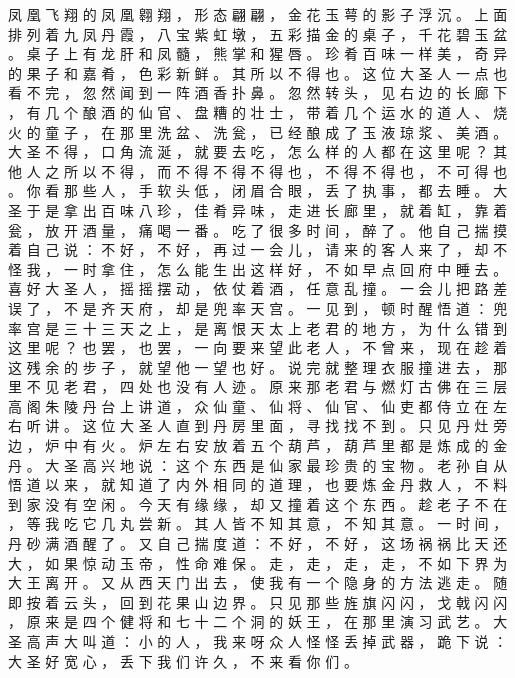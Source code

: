 {凤 凰 飞 翔 的 凤 凰 翱 翔 ， 形 态 翩 翩 ， 金 花 玉 萼 的 影 子 浮 沉 。
上 面 排 列 着 九 凤 丹 霞 ， 八 宝 紫 虹 墩 ， 五 彩 描 金 的 桌 子 ， 千 花 碧 玉 盆 。
桌 子 上 有 龙 肝 和 凤 髓 ， 熊 掌 和 猩 唇 。
珍 肴 百 味 一 样 美 ， 奇 异 的 果 子 和 嘉 肴 ， 色 彩 新 鲜 。
其 所 以 不 得 也 。
这 位 大 圣 人 一 点 也 看 不 完 ， 忽 然 闻 到 一 阵 酒 香 扑 鼻 。
忽 然 转 头 ， 见 右 边 的 长 廊 下 ， 有 几 个 酿 酒 的 仙 官 、 盘 糟 的 壮 士 ， 带 着 几 个 运 水 的 道 人 、 烧 火 的 童 子 ， 在 那 里 洗 盆 、 洗 瓮 ， 已 经 酿 成 了 玉 液 琼 浆 、 美 酒 。
大 圣 不 得 ， 口 角 流 涎 ， 就 要 去 吃 ， 怎 么 样 的 人 都 在 这 里 呢 ？
其 他 人 之 所 以 不 得 ， 而 不 得 不 得 不 得 也 ， 不 得 不 得 也 ， 不 可 得 也 。
你 看 那 些 人 ， 手 软 头 低 ， 闭 眉 合 眼 ， 丢 了 执 事 ， 都 去 睡 。
大 圣 于 是 拿 出 百 味 八 珍 ， 佳 肴 异 味 ， 走 进 长 廊 里 ， 就 着 缸 ， 靠 着 瓮 ， 放 开 酒 量 ， 痛 喝 一 番 。
吃 了 很 多 时 间 ， 醉 了 。
他 自 己 揣 摸 着 自 己 说 ： 不 好 ， 不 好 ， 再 过 一 会 儿 ， 请 来 的 客 人 来 了 ， 却 不 怪 我 ， 一 时 拿 住 ， 怎 么 能 生 出 这 样 好 ， 不 如 早 点 回 府 中 睡 去 。
喜 好 大 圣 人 ， 摇 摇 摆 动 ， 依 仗 着 酒 ， 任 意 乱 撞 。
一 会 儿 把 路 差 误 了 ， 不 是 齐 天 府 ， 却 是 兜 率 天 宫 。
一 见 到 ， 顿 时 醒 悟 道 ： 兜 率 宫 是 三 十 三 天 之 上 ， 是 离 恨 天 太 上 老 君 的 地 方 ， 为 什 么 错 到 这 里 呢 ？ 也 罢 ， 也 罢 ， 一 向 要 来 望 此 老 人 ， 不 曾 来 ， 现 在 趁 着 这 残 余 的 步 子 ， 就 望 他 一 望 也 好 。
说 完 就 整 理 衣 服 撞 进 去 ， 那 里 不 见 老 君 ， 四 处 也 没 有 人 迹 。
原 来 那 老 君 与 燃 灯 古 佛 在 三 层 高 阁 朱 陵 丹 台 上 讲 道 ， 众 仙 童 、 仙 将 、 仙 官 、 仙 吏 都 侍 立 在 左 右 听 讲 。
这 位 大 圣 人 直 到 丹 房 里 面 ， 寻 找 找 不 到 。
只 见 丹 灶 旁 边 ， 炉 中 有 火 。
炉 左 右 安 放 着 五 个 葫 芦 ， 葫 芦 里 都 是 炼 成 的 金 丹 。
大 圣 高 兴 地 说 ： 这 个 东 西 是 仙 家 最 珍 贵 的 宝 物 。
老 孙 自 从 悟 道 以 来 ， 就 知 道 了 内 外 相 同 的 道 理 ， 也 要 炼 金 丹 救 人 ， 不 料 到 家 没 有 空 闲 。
今 天 有 缘 缘 ， 却 又 撞 着 这 个 东 西 。
趁 老 子 不 在 ， 等 我 吃 它 几 丸 尝 新 。
其 人 皆 不 知 其 意 ， 不 知 其 意 。
一 时 间 ， 丹 砂 满 酒 醒 了 。
又 自 己 揣 度 道 ： 不 好 ， 不 好 ， 这 场 祸 祸 比 天 还 大 ， 如 果 惊 动 玉 帝 ， 性 命 难 保 。
走 ， 走 ， 走 ， 走 ， 不 如 下 界 为 大 王 离 开 。
又 从 西 天 门 出 去 ， 使 我 有 一 个 隐 身 的 方 法 逃 走 。
随 即 按 着 云 头 ， 回 到 花 果 山 边 界 。
只 见 那 些 旌 旗 闪 闪 ， 戈 戟 闪 闪 ， 原 来 是 四 个 健 将 和 七 十 二 个 洞 的 妖 王 ， 在 那 里 演 习 武 艺 。
大 圣 高 声 大 叫 道 ： 小 的 人 ， 我 来 呀 众 人 怪 怪 丢 掉 武 器 ， 跪 下 说 ： 大 圣 好 宽 心 ， 丢 下 我 们 许 久 ， 不 来 看 你 们 。
}
